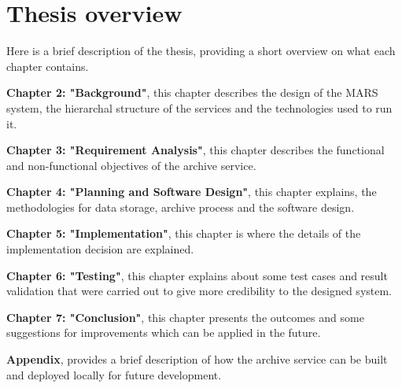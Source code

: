     \newpage
    \section{Thesis overview} 
        Here is a brief description of the thesis, providing a short overview on what each
        chapter contains.
        
        \par
        \textbf{Chapter 2: "Background"}, this chapter describes the design
        of the MARS system, the hierarchal structure of the services and the technologies used to
        run it.

        \par
        \textbf{Chapter 3: "Requirement Analysis"}, this chapter describes the functional and
        non-functional objectives of the archive service.

        \par
        \textbf{Chapter 4: "Planning and Software Design"}, this chapter explains, the 
        methodologies for data storage, archive process and the software design.

        \par
        \textbf{Chapter 5: "Implementation"}, this chapter is where the details of the 
        implementation decision are explained.

        \par
        \textbf{Chapter 6: "Testing"}, this chapter explains about 
        some test cases and result validation that were carried out to give more credibility to the designed system.

        \par
        \textbf{Chapter 7: "Conclusion"}, this chapter presents the outcomes and some 
        suggestions for improvements which can be applied in the future.
        
        \textbf{Appendix}, provides a brief description of how the archive service can be built and deployed locally for future development.

